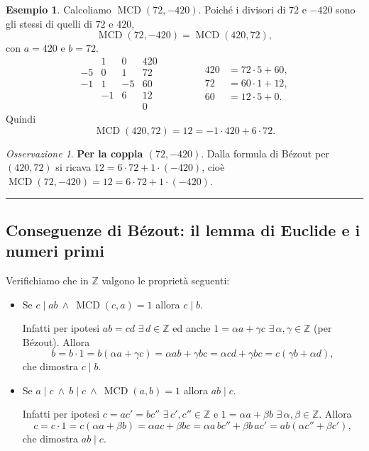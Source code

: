 \documentclass[11pt,a4paper]{article}
\newcommand{\Z}{\mathbb{Z}}
\theoremstyle{definition}
\newtheorem{esempio}[definizione]{Esempio}
\theoremstyle{plain}
\theoremstyle{remark}
\newtheorem*{osservazione}{Osservazione}
\begin{document}
\begin{esempio}
Calcoliamo $\operatorname{MCD}(72,-420)$. Poiché i divisori di $72$ e $-420$ sono gli stessi di quelli di $72$ e $420$,
\[
\operatorname{MCD}(72,-420)=\operatorname{MCD}(420,72),
\]
con $a=420$ e $b=72$.
\[
\begin{array}{r|rr|r}
 & 1 & 0 & 420\\
-5 & 0 & 1 & 72\\
-1 & 1 & -5 & 60\\
 & -1 & 6 & {12}\\
 & & & 0
\end{array}
\qquad\qquad
\begin{aligned}
420&=72\cdot5+60,\\
72&=60\cdot1+12,\\
60&=12\cdot5+0.
\end{aligned}
\]
Quindi
\[
\operatorname{MCD}(420,72)=12=-1\cdot420+6\cdot72 .
\]
\end{esempio}

\begin{osservazione}
\textbf{Per la coppia $(72,-420)$}. 
Dalla formula di Bézout per $(420,72)$ si ricava $12=6\cdot72+1\cdot(-420)$, cioè $\operatorname{MCD}(72,-420)=12=6\cdot72+1\cdot(-420)$.
\end{osservazione}

\bigskip\hrule\bigskip

\subsection{Conseguenze di Bézout: il lemma di Euclide e i numeri primi}

Verifichiamo che in $\Z$ valgono le proprietà seguenti:
\begin{itemize}
\item[$\odot$] Se $c\mid ab\ \wedge\ \operatorname{MCD}(c,a)=1$ allora $c\mid b$.

Infatti per ipotesi $ab=cd$ $\exists\,d\in\Z$ ed anche $1=\alpha a+\gamma c$ $\exists\,\alpha,\gamma\in\Z$ (per Bézout). Allora
\[
b=b\cdot1=b(\alpha a+\gamma c)=\alpha ab+\gamma bc=\alpha cd+\gamma bc=c(\gamma b+\alpha d),
\]
che dimostra $c\mid b$.

\item[$\odot\!\odot$] Se $a\mid c\ \wedge\ b\mid c\ \wedge\ \operatorname{MCD}(a,b)=1$ allora $ab\mid c$.

Infatti per ipotesi $c=ac'=bc''$ $\exists\,c',c''\in\Z$ e $1=\alpha a+\beta b$ $\exists\,\alpha,\beta\in\Z$. Allora
\[
c=c\cdot1=c(\alpha a+\beta b)=\alpha ac+\beta bc=\alpha a\,bc''+\beta b\,ac'=ab(\alpha c''+\beta c'),
\]
che dimostra $ab\mid c$.
\end{itemize}
\end{document}
